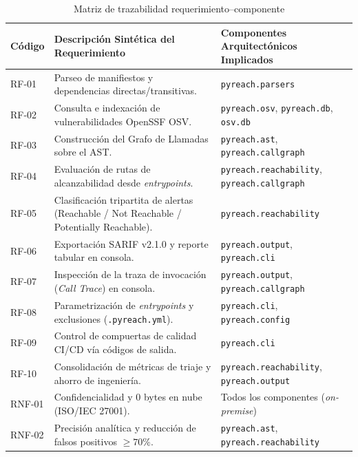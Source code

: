 \begin{table}[H]
\centering
\caption{Matriz de trazabilidad requerimiento--componente}
\label{p5:tab:trazabilidad_req_comp}
\small
{}
\begin{tabularx}{\textwidth}{l p{7.5cm} X}
\toprule
\textbf{Código} & \textbf{Descripción Sintética del Requerimiento} & \textbf{Componentes Arquitectónicos Implicados} \\
\midrule
RF-01 & Parseo de manifiestos y dependencias directas/transitivas. & \texttt{pyreach.\allowbreak parsers} \\
RF-02 & Consulta e indexación de vulnerabilidades OpenSSF OSV. & \texttt{pyreach.\allowbreak osv}, \texttt{pyreach.\allowbreak db}, \texttt{osv.\allowbreak db} \\
RF-03 & Construcción del Grafo de Llamadas sobre el AST. & \texttt{pyreach.\allowbreak ast}, \texttt{pyreach.\allowbreak callgraph} \\
RF-04 & Evaluación de rutas de alcanzabilidad desde \textit{entrypoints}. & \texttt{pyreach.\allowbreak reachability}, \texttt{pyreach.\allowbreak callgraph} \\
RF-05 & Clasificación tripartita de alertas (Reachable / Not Reachable / Potentially Reachable). & \texttt{pyreach.\allowbreak reachability} \\
RF-06 & Exportación SARIF v2.1.0 y reporte tabular en consola. & \texttt{pyreach.\allowbreak output}, \texttt{pyreach.\allowbreak cli} \\
RF-07 & Inspección de la traza de invocación (\textit{Call Trace}) en consola. & \texttt{pyreach.\allowbreak output}, \texttt{pyreach.\allowbreak callgraph} \\
RF-08 & Parametrización de \textit{entrypoints} y exclusiones (\texttt{.\allowbreak pyreach.\allowbreak yml}). & \texttt{pyreach.\allowbreak cli}, \texttt{pyreach.\allowbreak config} \\
RF-09 & Control de compuertas de calidad CI/CD vía códigos de salida. & \texttt{pyreach.\allowbreak cli} \\
RF-10 & Consolidación de métricas de triaje y ahorro de ingeniería. & \texttt{pyreach.\allowbreak reachability}, \texttt{pyreach.\allowbreak output} \\
\midrule
RNF-01 & Confidencialidad y 0 bytes en nube (ISO/IEC 27001). & Todos los componentes (\textit{on-premise}) \\
RNF-02 & Precisión analítica y reducción de falsos positivos $\ge 70\%$. & \texttt{pyreach.\allowbreak ast}, \texttt{pyreach.\allowbreak reachability} \\

\end{tabularx}
\end{table}
